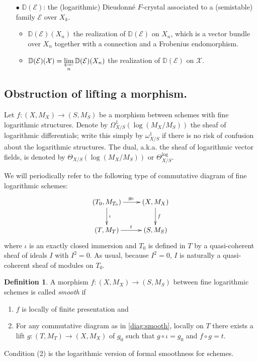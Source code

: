 \documentclass[12pt,twoside]{book}
\theoremstyle{plain}
\theoremstyle{definition}
\newtheorem{definition}[definition]{Definition}
\theoremstyle{remark}
\numberwithin{equation}{section}
\begin{document}
\begin{itemize}
\begin{itemize}
\end{itemize}
\item[$\bullet$] $\mathbb{D}(\mathcal E)$: the (logarithmic) Dieudonn\'e $F$-crystal associated to a (semistable) family $\mathcal E$ over $X_k$.
\begin{itemize}
\item $\mathbb D(\mathcal E)(X_n)$ the realization of $\mathbb{D}(\mathcal E)$ on $X_n$, which is a vector bundle over $X_n$ together with a connection and a Frobenius endomorphism.
\item $\mathbb D(\mathcal E)(\mathcal X) = \varprojlim\limits_n\mathbb D(\mathcal E)(X_n)$ the realization of $\mathbb{D}(\mathcal E)$ on $\mathcal X$.
\end{itemize}
\end{itemize}

\subsection{Obstruction of lifting a morphism.}
Let $f\colon (X,M_X)\rightarrow (S,M_S)$ be a morphism between schemes with fine logarithmic structures. Denote by $\Omega_{X/S}^1(\log(M_X/M_S))$ the sheaf of logarithmic differentials; write this simply by $\omega^1_{X/S}$ if there is no risk of confusion about the logarithmic structures. The dual, a.k.a. the sheaf of logarithmic vector fields, is denoted by $\Theta_{X/S}(\log(M_X/M_S))$ or $\Theta_{X/S}^{\log}$.

We will periodically refer to the following type of commutative diagram of fine logarithmic schemes:
\begin{equation}
\label{diag:smooth}
\xymatrix{(T_0,M_{T_0}) \ar[r]^{g_0} \ar[d]^{\iota} & (X,M_X) \ar[d]^{f} \\
(T,M_T) \ar[r]^{t} 
& (S,M_S) \\}
\end{equation}
where $\iota$ is an exactly closed immersion and $T_0$ is defined in $T$ by a quasi-coherent sheaf of ideals $I$ with $I^2=0$. As usual, because $I^2=0$, $I$ is naturally a quasi-coherent sheaf of modules on $T_0$.

\begin{definition}\cite[3.3 on p. 201]{Kat89} A morphism $f\colon (X,M_X)\rightarrow (S,M_S)$ between fine logarithmic schemes is called \emph{smooth} if
\begin{enumerate}
\item $f$ is locally of finite presentation and
\item For any commutative diagram as in \eqref{diag:smooth}, locally on $T$ there exists a lift $g\colon(T,M_T)\rightarrow (X,M_X)$ of $g_0$ such that $g\circ \iota=g_0$ and $f\circ g =t$.
\end{enumerate}
\end{definition}
Condition (2) is the logarithmic version of formal smoothness for schemes.
\end{document}
